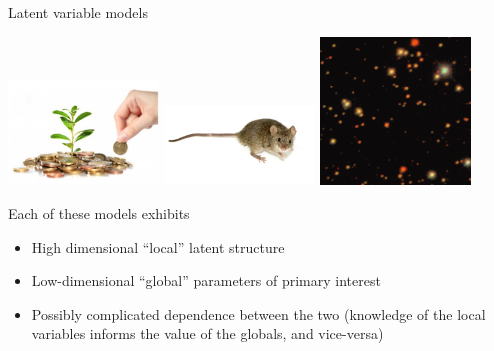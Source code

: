 

\begin{frame}{Latent variable models}

    \includegraphics[width=0.3\textwidth]{static_images/microcredit.png}
    \includegraphics[width=0.3\textwidth]{static_images/mouse.jpg}
    \includegraphics[width=0.3\textwidth]{static_images/sdss.png}

\vspace{3em}

Each of these models exhibits
\begin{itemize}
    \item High dimensional ``local'' latent structure
    \item Low-dimensional ``global'' parameters of primary interest
    \item Possibly complicated dependence between the two
        (knowledge of the local variables informs the value of the globals,
        and vice-versa)
\end{itemize}

\end{frame}
